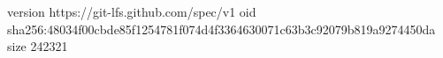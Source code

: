 version https://git-lfs.github.com/spec/v1
oid sha256:48034f00cbde85f1254781f074d4f3364630071c63b3c92079b819a9274450da
size 242321
